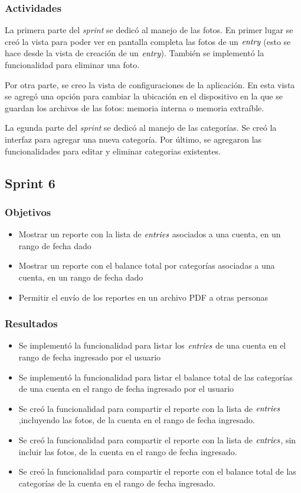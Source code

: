\subsubsection{Actividades}
La primera parte del \textit{sprint} se dedicó al manejo de las fotos. En primer lugar se creó la vista para poder ver en pantalla completa las fotos de un $\textit{entry}$ (esto se hace desde la vista de creación de un $\textit{entry}$). También se implementó la funcionalidad para eliminar una foto.

Por otra parte, se creo la vista de configuraciones de la aplicación. En esta vista se agregó una opción para cambiar la ubicación en el dispositivo en la que se guardan los archivos de las fotos: memoria interna o memoria extraíble.

La egunda parte del \textit{sprint} se dedicó al manejo de las categorías. Se creó la interfaz para agregar una nueva categoría. Por último, se agregaron las funcionalidades para editar y eliminar categorias existentes.


\subsection{Sprint 6}
\subsubsection{Objetivos}
\begin{itemize}
\item Mostrar un reporte con la lista de $\textit{entries}$ asociados a una cuenta, en un rango de fecha dado
\item Mostrar un reporte con el balance total por categorías asociadas a una cuenta, en un rango de fecha dado
\item Permitir el envío de los reportes en un archivo PDF a otras personas

\end{itemize}

\subsubsection{Resultados}
\begin{itemize}
\item Se implementó la funcionalidad para listar los $\textit{entries}$ de una cuenta en el rango de fecha ingresado por el usuario
\item Se implementó la funcionalidad para listar el balance total de las categorías de una cuenta en el rango de fecha ingresado por el usuario
\item Se creó la funcionalidad para compartir el reporte con la lista de $\textit{entries}$,incluyendo las fotos, de la cuenta en el rango de fecha ingresado.
\item Se creó la funcionalidad para compartir el reporte con la lista de $\textit{entries}$, sin incluir las fotos, de la cuenta en el rango de fecha ingresado.
\item Se creó la funcionalidad para compartir el reporte con el balance total de las categorías de la cuenta en el rango de fecha ingresado.
\end{itemize}

